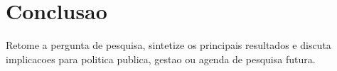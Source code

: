 \section{Conclusao}

Retome a pergunta de pesquisa, sintetize os principais resultados e discuta implicacoes para politica publica, gestao ou agenda de pesquisa futura.